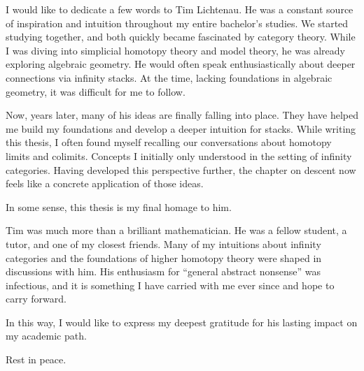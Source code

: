 
I would like to dedicate a few words to Tim Lichtenau.
He was a constant source of inspiration and intuition throughout my entire bachelor’s studies. We started studying together, and both quickly became fascinated by category theory. While I was diving into simplicial homotopy theory and model theory, he was already exploring algebraic geometry. He would often speak enthusiastically about deeper connections via infinity stacks. At the time, lacking foundations in algebraic geometry, it was difficult for me to follow.

Now, years later, many of his ideas are finally falling into place. They have helped me build my foundations and develop a deeper intuition for stacks. While writing this thesis, I often found myself recalling our conversations about homotopy limits and colimits. Concepts I initially only understood in the setting of infinity categories. Having developed this perspective further, the chapter on descent now feels like a concrete application of those ideas.

In some sense, this thesis is my final homage to him.

Tim was much more than a brilliant mathematician. He was a fellow student, a tutor, and one of my closest friends. Many of my intuitions about infinity categories and the foundations of higher homotopy theory were shaped in discussions with him. His enthusiasm for “general abstract nonsense” was infectious, and it is something I have carried with me ever since and hope to carry forward.

In this way, I would like to express my deepest gratitude for his lasting impact on my academic path.

Rest in peace.
